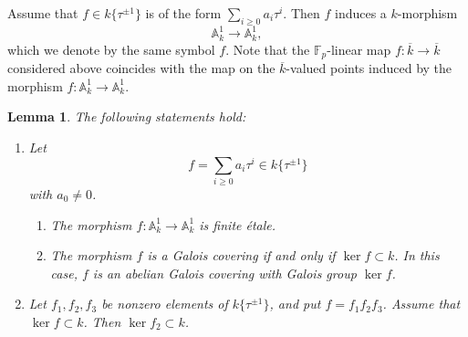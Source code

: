 \documentclass[12pt,a4paper]{amsart}
\newtheorem{lemma}[theorem]{Lemma}
\theoremstyle{definition}
\def\A{{\mathbb A}}
\def\F{{\mathbb F}}
\theoremstyle{remark}
\begin{document}
Assume that $f\in k\{\tau^{\pm1}\}$ is of the form $\sum_{i\geq0}a_i\tau^i$. Then $f$ induces a $k$-morphism 
\[\A^1_k\to\A^1_k,\]
which we denote by the same symbol $f$. Note that the $\F_p$-linear map $f\colon \overline{k}\to \overline{k}$ considered above coincides with the map on the $\overline{k}$-valued points induced by the morphism $ f\colon \A_k^1\to \A_k^1$. 
\begin{lemma}\label{b2}
The following statements hold: 
\begin{enumerate}
\item Let
\[
f=\sum_{i\ge0} a_i\tau^i \in k\{\tau^{\pm1}\}
\]
with $a_0\ne0$. 
\begin{enumerate}
\item The morphism $f\colon \A^1_k\to \A^1_k$ is finite \'etale. 
\item The morphism $f$ is a Galois covering if and only if 
$\ker f\subset k$. In this case, $f$ is an abelian Galois covering with Galois group $\ker f$.
\end{enumerate} 

\item Let $f_1,f_2,f_3$ be nonzero elements of $k\{\tau^{\pm1}\}$, and put $f=f_1f_2f_3$. Assume  that  $\ker f\subset k$. Then $\ker f_2\subset k$. 
\end{enumerate}
\end{lemma}
\end{document}
